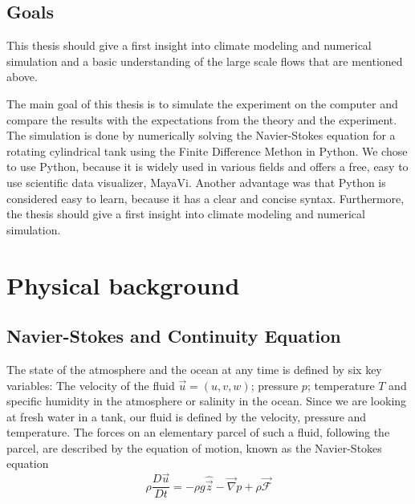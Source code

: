 \documentclass[12pt, a4paper]{article} %
\begin{document}
	\subsection{Goals}
	
	This thesis should give a first insight into climate modeling and numerical simulation and a basic understanding of the large scale flows that are mentioned above.
		
	The main goal of this thesis is to simulate the experiment on the computer and compare the results with the expectations from the theory and the experiment. The simulation is done by numerically solving the Navier-Stokes equation for a rotating cylindrical tank using the Finite Difference Methon in Python.
	We chose to use Python, because it is widely used in various fields and offers a free, easy to use scientific data visualizer, MayaVi. Another advantage was that Python is considered easy to learn, because it has a clear and concise syntax.
	Furthermore, the thesis should give a first insight into climate modeling and numerical simulation. 
	
%	
%	

\newpage

\section{Physical background}

	\subsection{Navier-Stokes and Continuity Equation}
		
		The state of the atmosphere and the ocean at any time is defined by six key variables:
		The velocity of the fluid $\vec{u}=(u,v,w)$; pressure $p$; temperature $T$ and specific humidity in the atmosphere or salinity in the ocean. Since we are looking at fresh water in a tank, our fluid is defined by the velocity, pressure and temperature. The forces on an elementary parcel of such a fluid, following the parcel, are described by the equation of motion, known as the Navier-Stokes equation
		\begin{equation}
			\rho \frac{D\vec{u}}{Dt} = -\rho g \hat{\vec{z}} - \vec{\nabla} p + \rho \vec{\mathcal{F}}
			\label{eq:Simple NSG}
		\end{equation} 
		
\end{document}
